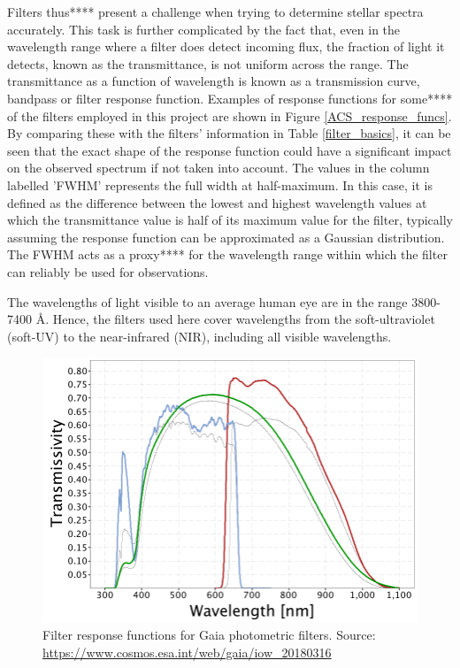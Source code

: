 \documentclass[12pt, a4paper]{report}
\begin{document}
Filters thus**** present a challenge when trying to determine stellar spectra accurately. This task is further complicated by the fact that, even in the wavelength range where a filter does detect incoming flux, the fraction of light it detects, known as the transmittance, is not uniform across the range. The transmittance as a function of wavelength is known as a transmission curve, bandpass or filter response function. Examples of response functions for some**** of the filters employed in this project are shown in Figure \ref{ACS_response_funcs}. By comparing these with the filters' information in Table \ref{filter_basics}, it can be seen that the exact shape of the response function could have a significant impact on the observed spectrum if not taken into account.
The values in the column labelled 'FWHM' represents the full width at half-maximum. In this case, it is defined as the difference between the lowest and highest wavelength values at which the transmittance value is half of its maximum value for the filter, typically assuming the response function can be approximated as a Gaussian distribution. The FWHM acts as a proxy**** for the wavelength range within which the filter can reliably be used for observations.

The wavelengths of light visible to an average human eye are in the range 3800-7400 \AA . Hence, the filters used here cover wavelengths from the soft-ultraviolet (soft-UV) to the near-infrared (NIR),  including all visible wavelengths.

\begin{figure}[h]
\begin{center}
\includegraphics[scale=0.5]{GaiaDR2Passbands.png}
\caption{Filter response functions for Gaia photometric filters. Source: \protect\url{https://www.cosmos.esa.int/web/gaia/iow_20180316}}
\label{Gaia_response_funcs}
\end{center}
\end{figure}
\end{document}
